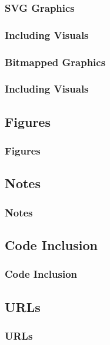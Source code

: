 {\begin{frame}[fragile]
\end{frame}

\subsubsection{SVG Graphics}
\begin{frame}[fragile]
  \frametitle{Including Visuals }
  \vspace{3mm}
  
\end{frame}

\subsubsection{Bitmapped Graphics}
\begin{frame}[fragile]
  \frametitle{Including Visuals }
  \vspace{3mm}
  
\end{frame}

\subsection{Figures}
\begin{frame}[fragile]
  \frametitle{Figures}
  \vspace{3mm}
  
\end{frame}

\subsection{Notes}
\begin{frame}[fragile]
  \frametitle{Notes}
  \vspace{3mm}
  
\end{frame}

\subsection{Code Inclusion}
\begin{frame}[fragile]
  \frametitle{Code Inclusion}
  \vspace{3mm}
  
\end{frame}

\subsection{URLs}
\begin{frame}[fragile]
  \frametitle{URLs}
  \vspace{3mm}
  
\end{frame}

}

